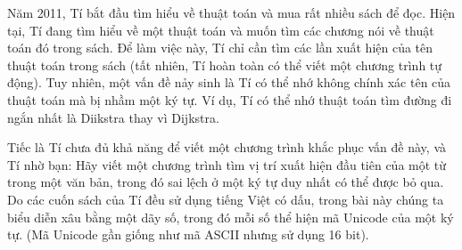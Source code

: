 Năm 2011, Tí bắt đầu tìm hiểu về thuật toán và mua rất nhiều sách để đọc. Hiện tại, Tí đang tìm hiểu về một thuật toán và muốn tìm các chương nói về thuật toán đó trong sách. Để làm việc này, Tí chỉ cần tìm các lần xuất hiện của tên thuật toán trong sách (tất nhiên, Tí hoàn toàn có thể viết một chương trình tự động). Tuy nhiên, một vấn đề nảy sinh là Tí có thể nhớ không chính xác tên của thuật toán mà bị nhầm một ký tự. Ví dụ, Tí có thể nhớ thuật toán tìm đường đi ngắn nhất là Diikstra thay vì Dijkstra.





Tiếc là Tí chưa đủ khả năng để viết một chương trình khắc phục vấn đề này, và Tí nhờ bạn: Hãy viết một chương trình tìm vị trí xuất hiện đầu tiên của một từ trong một văn bản, trong đó sai lệch ở một ký tự duy nhất có thể được bỏ qua. Do các cuốn sách của Tí đều sử dụng tiếng Việt có dấu, trong bài này chúng ta biểu diễn xâu bằng một dãy số, trong đó mỗi số thể hiện mã Unicode của một ký tự. (Mã Unicode gần giống như mã ASCII nhưng sử dụng 16 bit).